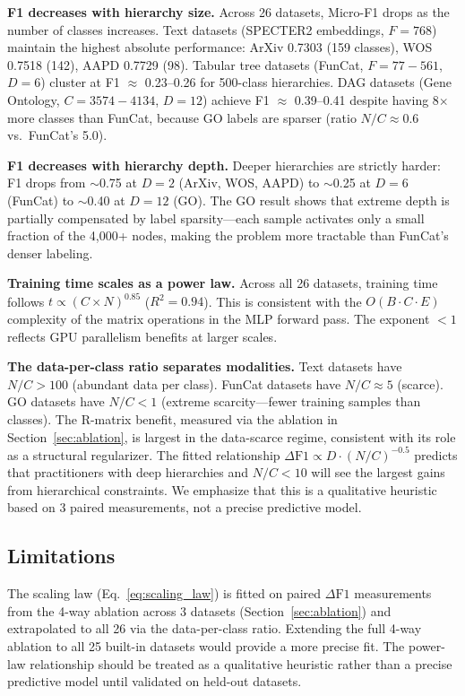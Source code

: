 \textbf{F1 decreases with hierarchy size.}
Across 26 datasets, Micro-F1 drops as the number of classes increases.
Text datasets (SPECTER2 embeddings, $F{=}768$) maintain the highest
absolute performance: ArXiv 0.7303 (159 classes), WOS 0.7518 (142),
AAPD 0.7729 (98). Tabular tree datasets (FunCat, $F{=}77{-}561$,
$D{=}6$) cluster at F1 $\approx$ 0.23--0.26 for 500-class hierarchies.
DAG datasets (Gene Ontology, $C{=}3574{-}4134$, $D{=}12$) achieve F1
$\approx$ 0.39--0.41 despite having 8$\times$ more classes than FunCat,
because GO labels are sparser (ratio $N/C \approx 0.6$ vs.\ FunCat's 5.0).

\textbf{F1 decreases with hierarchy depth.}
Deeper hierarchies are strictly harder: F1 drops from $\sim$0.75 at
$D{=}2$ (ArXiv, WOS, AAPD) to $\sim$0.25 at $D{=}6$ (FunCat) to
$\sim$0.40 at $D{=}12$ (GO). The GO result shows that extreme
depth is partially compensated by label sparsity---each sample activates
only a small fraction of the 4,000+ nodes, making the problem more
tractable than FunCat's denser labeling.

\textbf{Training time scales as a power law.}
Across all 26 datasets, training time follows $t \propto
(C \times N)^{0.85}$ ($R^2 = 0.94$). This is consistent with the
$O(B \cdot C \cdot E)$ complexity of the matrix operations in the MLP
forward pass. The exponent $< 1$ reflects GPU parallelism benefits at
larger scales.

\textbf{The data-per-class ratio separates modalities.}
Text datasets have $N/C > 100$ (abundant data per class). FunCat
datasets have $N/C \approx 5$ (scarce). GO datasets have $N/C < 1$
(extreme scarcity---fewer training samples than classes). The R-matrix
benefit, measured via the ablation in Section~\ref{sec:ablation}, is
largest in the data-scarce regime, consistent with its role as a
structural regularizer. The fitted relationship
$\Delta\text{F1} \propto D \cdot (N/C)^{-0.5}$ predicts that
practitioners with deep hierarchies and $N/C < 10$ will see the largest
gains from hierarchical constraints. We emphasize that this is a
qualitative heuristic based on 3 paired measurements, not a precise
predictive model.

\subsection{Limitations}

The scaling law (Eq.~\ref{eq:scaling_law}) is fitted on paired
$\Delta\text{F1}$ measurements from the 4-way ablation across 3 datasets
(Section~\ref{sec:ablation}) and extrapolated to all 26 via the
data-per-class ratio. Extending the full 4-way ablation to all 25
built-in datasets would provide a more precise fit. The power-law
relationship should be treated as a qualitative heuristic rather than a
precise predictive model until validated on held-out datasets.
